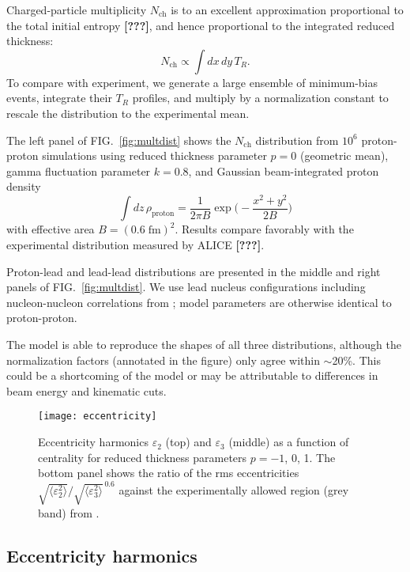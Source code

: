 \documentclass[aps,prl,reprint,amsmath,nofootinbib]{revtex4-1}
\newcommand{\nch}{N_\text{ch}}
\newcommand{\needcite}{\textbf{[???]}}
\begin{document}
Charged-particle multiplicity $\nch$ is to an excellent approximation proportional to the total initial
entropy \needcite, and hence proportional to the integrated reduced thickness:
\begin{equation}
  \nch \propto \int dx \, dy \, T_R.
\end{equation}
To compare with experiment, we generate a large ensemble of minimum-bias events, integrate their $T_R$
profiles, and multiply by a normalization constant to rescale the distribution to the experimental mean.

The left panel of FIG.~\ref{fig:multdist} shows the $\nch$ distribution from $10^6$ proton-proton simulations
using reduced thickness parameter $p = 0$ (geometric mean), gamma fluctuation parameter $k = 0.8$, and
Gaussian beam-integrated proton density
\begin{equation}
  \int dz \, \rho_\text{proton} = \frac{1}{2\pi B} \exp\biggr( -\frac{x^2 + y^2}{2B} \biggr)
\end{equation}
with effective area $B = (0.6\;\text{fm})^2$.  Results compare favorably with the experimental distribution
measured by ALICE \needcite.

Proton-lead and lead-lead distributions are presented in the middle and right panels of
FIG.~\ref{fig:multdist}.  We use lead nucleus configurations including nucleon-nucleon correlations from
\cite{nucleon-correlations}; model parameters are otherwise identical to proton-proton.

The model is able to reproduce the shapes of all three distributions, although the normalization factors
(annotated in the figure) only agree within $\sim$20\%.  This could be a shortcoming of the model or may be
attributable to differences in beam energy and kinematic cuts.

\begin{figure}[b]
  \texttt{[image: eccentricity]}
  \caption{
    \label{fig:eccen}
    Eccentricity harmonics $\varepsilon_2$ (top) and $\varepsilon_3$ (middle) as a function of centrality for
    reduced thickness parameters $p = -1$, 0, 1.  The bottom panel shows the ratio of the rms eccentricities
    $\sqrt{\langle \varepsilon_2^2 \rangle}/\sqrt{\langle \varepsilon_3^2 \rangle}^{\,0.6}$ against the
    experimentally allowed region (grey band) from \cite{constraining-ic}.
  }
\end{figure}

\subsection{Eccentricity harmonics}
\end{document}
